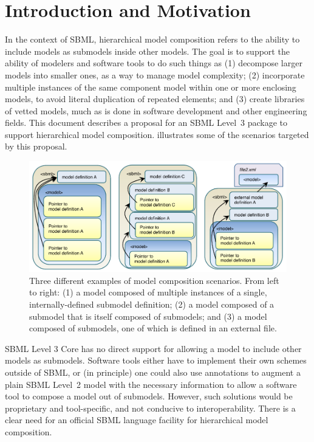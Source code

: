 
\section{Introduction and Motivation}

In the context of SBML, hierarchical model composition refers to the
ability to include models as submodels inside other models. The goal is
to support the ability of modelers and software tools to do such things
as (1) decompose larger models into smaller ones, as a way to manage
model complexity; (2) incorporate multiple instances of the same
component model within one or more enclosing models, to avoid literal
duplication of repeated elements; and (3) create libraries of vetted
models, much as is done in software development and other engineering
fields. This document describes a proposal for an SBML Level~3 package
to support hierarchical model composition.   illustrates
some of the scenarios targeted by this proposal.

\begin{figure}[b]
  \includegraphics{figs/figure1}
  \caption{Three different examples of model composition scenarios.
    From left to right: (1) a model composed of multiple instances of a
    single, internally-defined submodel definition; (2) a model composed
    of a submodel that is itself composed of submodels; and (3) a model
    composed of submodels, one of which is defined in an external file.}
  \label{fig1}
\end{figure}

SBML Level 3 Core has no direct support for allowing a model to include
other models as submodels. Software tools either have to implement their
own schemes outside of SBML, or (in principle) one could also use
annotations to augment a plain SBML Level~2 model with the necessary
information to allow a software tool to compose a model out of
submodels.  However, such solutions would be proprietary and
tool-specific, and not conducive to interoperability. There is a clear
need for an official SBML language facility for hierarchical model
composition.

